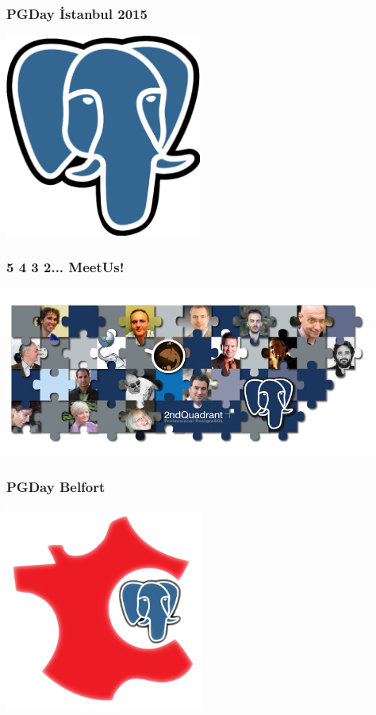\documentclass{beamer}
\begin{document}
\begin{frame}[fragile]
  \frametitle{PGDay İstanbul 2015}

  
  \begin{center}
    \includegraphics[height=18em]{postgres-logo.eps}
  \end{center}
\end{frame}

\begin{frame}[fragile]
  \frametitle{5 4 3 2... MeetUs!}

  
  \begin{center}
    \includegraphics[height=15em]{puzzle-pag.jpg}
  \end{center}
\end{frame}

\begin{frame}[fragile]
  \frametitle{PGDay Belfort}

  
  \begin{center}
    \includegraphics[height=18em]{belfort.png}
  \end{center}
\end{frame}
\end{document}
